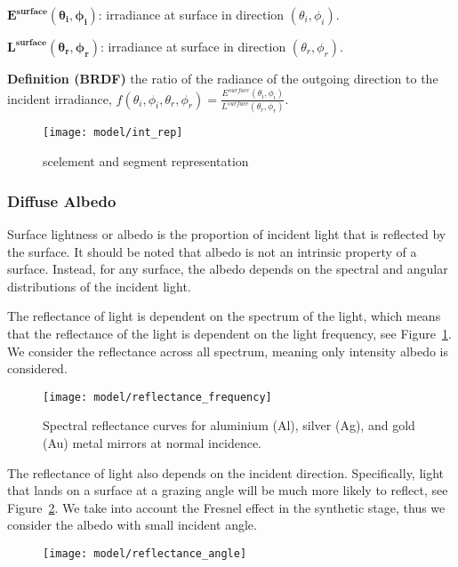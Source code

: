 $\mathbf{E^{surface}(\theta_i, \phi_i)}$: irradiance at surface in direction $(\theta_i, \phi_i)$.

$\mathbf{L^{surface}(\theta_r, \phi_r)}$: irradiance at surface in direction $(\theta_r, \phi_r)$.

\textbf{Definition (BRDF)} the ratio of the radiance of the outgoing direction to the incident irradiance, \ie $f(\theta_i, \phi_i, \theta_r, \phi_r)=\frac{E^{surface}(\theta_i, \phi_i)}{L^{surface}(\theta_r, \phi_r)}$.

\begin{figure}[h]
\centering
\texttt{[image: model/int\_rep]}
\caption{scelement and segment representation}
\end{figure}

\subsubsection{Diffuse Albedo}
Surface lightness or albedo is the proportion of incident light that is reflected by the surface. It should be noted that albedo is not an intrinsic property of a surface. Instead, for any surface, the albedo depends on the spectral and angular distributions of the incident light. 

The reflectance of light is dependent on the spectrum of the light, which means that the reflectance of the light is dependent on the light frequency, see Figure~\ref{fig:alb_freq}. We consider the reflectance across all spectrum, meaning only intensity albedo is considered.

\begin{figure}[h]
\centering
\texttt{[image: model/reflectance\_frequency]}
\label{fig:alb_freq}
\caption{Spectral reflectance curves for aluminium (Al), silver (Ag), and gold (Au) metal mirrors at normal incidence.}
\end{figure}

The reflectance of light also depends on the incident direction. Specifically, light that lands on a surface at a grazing angle will be much more likely to reflect, see Figure~\ref{fig:alb_ang}. We take into account the Fresnel effect in the synthetic stage, thus we consider the albedo with small incident angle.

\begin{figure}[h]
\centering
\texttt{[image: model/reflectance\_angle]}
\label{fig:alb_ang}
\end{figure}

